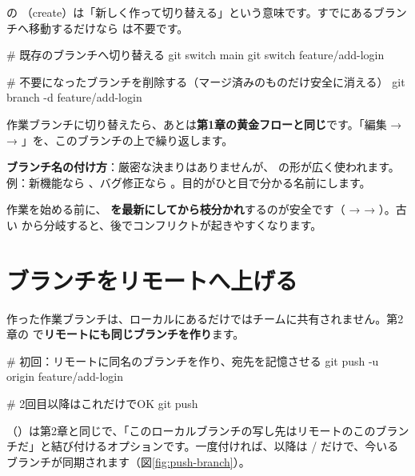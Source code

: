  の （create）は「新しく作って切り替える」という意味です。すでにあるブランチへ移動するだけなら  は不要です。

\begin{codebox}[bash]
\begin{code}
# 既存のブランチへ切り替える
git switch main
git switch feature/add-login

# 不要になったブランチを削除する（マージ済みのものだけ安全に消える）
git branch -d feature/add-login
\end{code}
\end{codebox}

作業ブランチに切り替えたら、あとは\textbf{第1章の黄金フローと同じ}です。「編集 →  → 」を、このブランチの上で繰り返します。

\begin{hintbox}
\textbf{ブランチ名の付け方}：厳密な決まりはありませんが、 の形が広く使われます。例：新機能なら 、バグ修正なら 。目的がひと目で分かる名前にします。
\end{hintbox}

\begin{warnbox}
作業を始める前に、\textbf{ を最新にしてから枝分かれ}するのが安全です（ →  → ）。古い  から分岐すると、後でコンフリクトが起きやすくなります。
\end{warnbox}

\section{ブランチをリモートへ上げる}

作った作業ブランチは、ローカルにあるだけではチームに共有されません。第2章の  で\textbf{リモートにも同じブランチを作り}ます。

\begin{codebox}[bash]
\begin{code}
# 初回：リモートに同名のブランチを作り、宛先を記憶させる
git push -u origin feature/add-login

# 2回目以降はこれだけでOK
git push
\end{code}
\end{codebox}

（）は第2章と同じで、「このローカルブランチの写し先はリモートのこのブランチだ」と結び付けるオプションです。一度付ければ、以降は  /  だけで、今いるブランチが同期されます（図\ref{fig:push-branch}）。

